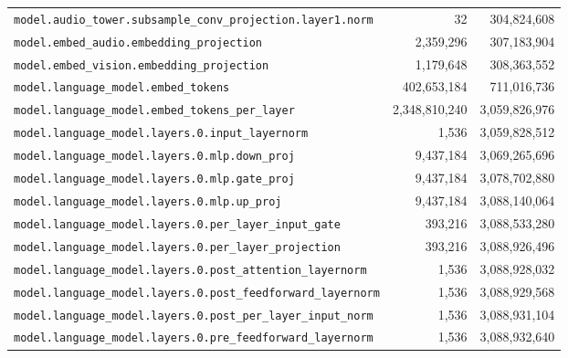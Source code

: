 \documentclass[10pt,a4paper]{article}
\theoremstyle{definition}
\begin{document}
\begin{appendices}
\begin{longtable}{p{9.5cm}rr}
\texttt{model.\allowbreak{}audio\_tower.\allowbreak{}subsample\_conv\_projection.\allowbreak{}layer1.\allowbreak{}norm} & 32 & 304,824,608 \\
\texttt{model.\allowbreak{}embed\_audio.\allowbreak{}embedding\_projection} & 2,359,296 & 307,183,904 \\
\texttt{model.\allowbreak{}embed\_vision.\allowbreak{}embedding\_projection} & 1,179,648 & 308,363,552 \\
\texttt{model.\allowbreak{}language\_model.\allowbreak{}embed\_tokens} & 402,653,184 & 711,016,736 \\
\texttt{model.\allowbreak{}language\_model.\allowbreak{}embed\_tokens\_per\_layer} & 2,348,810,240 & 3,059,826,976 \\
\texttt{model.\allowbreak{}language\_model.\allowbreak{}layers.\allowbreak{}0.\allowbreak{}input\_layernorm} & 1,536 & 3,059,828,512 \\
\texttt{model.\allowbreak{}language\_model.\allowbreak{}layers.\allowbreak{}0.\allowbreak{}mlp.\allowbreak{}down\_proj} & 9,437,184 & 3,069,265,696 \\
\texttt{model.\allowbreak{}language\_model.\allowbreak{}layers.\allowbreak{}0.\allowbreak{}mlp.\allowbreak{}gate\_proj} & 9,437,184 & 3,078,702,880 \\
\texttt{model.\allowbreak{}language\_model.\allowbreak{}layers.\allowbreak{}0.\allowbreak{}mlp.\allowbreak{}up\_proj} & 9,437,184 & 3,088,140,064 \\
\texttt{model.\allowbreak{}language\_model.\allowbreak{}layers.\allowbreak{}0.\allowbreak{}per\_layer\_input\_gate} & 393,216 & 3,088,533,280 \\
\texttt{model.\allowbreak{}language\_model.\allowbreak{}layers.\allowbreak{}0.\allowbreak{}per\_layer\_projection} & 393,216 & 3,088,926,496 \\
\texttt{model.\allowbreak{}language\_model.\allowbreak{}layers.\allowbreak{}0.\allowbreak{}post\_attention\_layernorm} & 1,536 & 3,088,928,032 \\
\texttt{model.\allowbreak{}language\_model.\allowbreak{}layers.\allowbreak{}0.\allowbreak{}post\_feedforward\_layernorm} & 1,536 & 3,088,929,568 \\
\texttt{model.\allowbreak{}language\_model.\allowbreak{}layers.\allowbreak{}0.\allowbreak{}post\_per\_layer\_input\_norm} & 1,536 & 3,088,931,104 \\
\texttt{model.\allowbreak{}language\_model.\allowbreak{}layers.\allowbreak{}0.\allowbreak{}pre\_feedforward\_layernorm} & 1,536 & 3,088,932,640 \\

\end{longtable}
\end{appendices}
\end{document}
